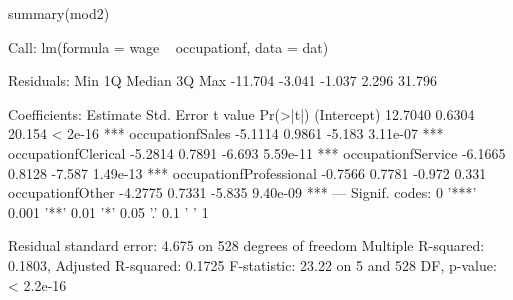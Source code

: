\begin{Schunk}
\begin{Sinput}
 summary(mod2)
\end{Sinput}
\begin{Soutput}
Call:
lm(formula = wage ~ occupationf, data = dat)

Residuals:
    Min      1Q  Median      3Q     Max 
-11.704  -3.041  -1.037   2.296  31.796 

Coefficients:
                        Estimate Std. Error t value Pr(>|t|)    
(Intercept)              12.7040     0.6304  20.154  < 2e-16 ***
occupationfSales         -5.1114     0.9861  -5.183 3.11e-07 ***
occupationfClerical      -5.2814     0.7891  -6.693 5.59e-11 ***
occupationfService       -6.1665     0.8128  -7.587 1.49e-13 ***
occupationfProfessional  -0.7566     0.7781  -0.972    0.331    
occupationfOther         -4.2775     0.7331  -5.835 9.40e-09 ***
---
Signif. codes:  0 '***' 0.001 '**' 0.01 '*' 0.05 '.' 0.1 ' ' 1

Residual standard error: 4.675 on 528 degrees of freedom
Multiple R-squared:  0.1803,	Adjusted R-squared:  0.1725 
F-statistic: 23.22 on 5 and 528 DF,  p-value: < 2.2e-16
\end{Soutput}
\end{Schunk}
